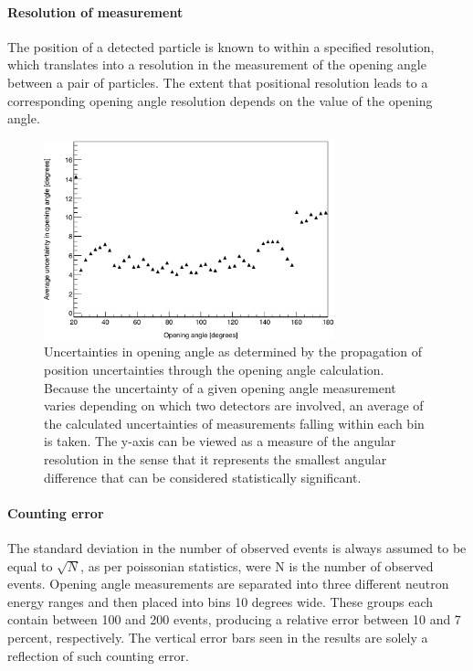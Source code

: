 \paragraph{Resolution of measurement}
The position of a detected particle is known to within a specified resolution, which translates into a resolution in the measurement of the opening angle between a pair of particles.
The extent that positional resolution leads to a corresponding opening angle resolution depends on the value of the opening angle.
\begin{figure}[h]
    \centering
    \includegraphics[width = 0.75\textwidth]{Content/Methods/OpeningAngleUncertainty.png}
    \caption{Uncertainties in opening angle as determined by the propagation of position uncertainties through the opening angle calculation.
    Because the uncertainty of a given opening angle measurement varies depending on which two detectors are involved, an average of the calculated uncertainties of measurements falling within each bin is taken.
    The y-axis can be viewed as a measure of the angular resolution in the sense that it represents the smallest angular difference that can be considered statistically significant.
    }
    \label{fig:CrossTalkExamplepng}
\end{figure}

\paragraph{Counting error}
The standard deviation in the number of observed events is always assumed to be equal to $\sqrt{N}$, as per poissonian  statistics, were N is the number of observed events.
Opening angle measurements are separated into three different neutron energy ranges and then placed into bins 10 degrees wide.
These groups each contain between 100 and 200 events, producing a relative error between 10 and 7 percent, respectively.
The vertical error bars seen in the results are solely a reflection of such counting error.

